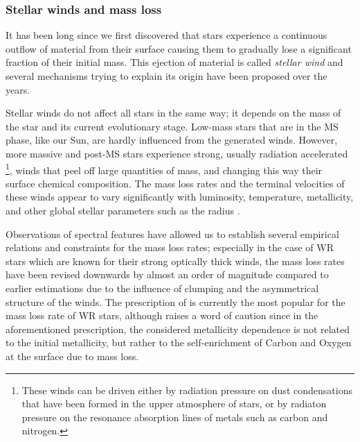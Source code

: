 \documentclass[../../main/thesis_msc.tex]{subfiles}
\begin{document}
						
					\subsubsection{Stellar winds and mass loss}
					
						It has been long since we first discovered that stars experience a continuous outflow of material from their surface causing them to gradually lose a significant fraction of their initial mass. This ejection of material is called \emph{stellar wind} and several mechanisms trying to explain its origin have been proposed over the years.
						
						Stellar winds do not affect all stars in the same way; it depends on the mass of the star and its current evolutionary stage. Low-mass stars that are in the MS phase, like our Sun, are hardly influenced from the generated winds. However, more massive and post-MS stars experience strong, usually radiation accelerated \footnote{These winds can be driven either by radiation pressure on dust condensations that have been formed in the upper atmosphere of stars, or by radiaton pressure on the resonance absorption lines of metals such as carbon and nitrogen.}, winds that peel off large quantities of mass, and changing this way their surface chemical composition. The mass loss rates and the terminal velocities of these winds appear to vary significantly with luminosity, temperature, metallicity, and other global stellar parameters such as the radius \citep{Hamann1982, deJager1988, Nugis2000, yoon17}.
						
						Observations of spectral features have allowed us to establish several empirical relations and constraints for the mass loss rates; especially in the case of WR stars which are known for their strong optically thick winds, the mass loss rates have been revised downwards by almost an order of magnitude \citep{Nugis2000} compared to earlier estimations \citep{Hamann1995, Langer1989} due to the influence of clumping and the asymmetrical structure of the winds. The prescription of \cite{Nugis2000} is currently the most popular for the mass loss rate of WR stars, although \cite{yoon17} raises a word of caution since in the aforementioned prescription, the considered metallicity dependence is not related to the initial metallicity, but rather to the self-enrichment of Carbon and Oxygen at the surface due to mass loss.
						
\end{document}
